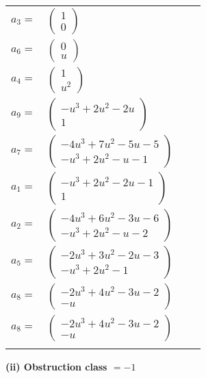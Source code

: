 \documentclass[1p]{elsarticle_modified}
\theoremstyle{definition}
\begin{document}
\begin{tabular}{m{7pt} m{180pt} m{7pt} m{180pt} }
\flushright $a_{3}=$&$\begin{pmatrix}1\\0\end{pmatrix}$ \\
\flushright $a_{6}=$&$\begin{pmatrix}0\\u\end{pmatrix}$ \\
\flushright $a_{4}=$&$\begin{pmatrix}1\\u^2\end{pmatrix}$ \\
\flushright $a_{9}=$&$\begin{pmatrix}- u^3+2 u^2-2 u\\1\end{pmatrix}$ \\
\flushright $a_{7}=$&$\begin{pmatrix}-4 u^3+7 u^2-5 u-5\\- u^3+2 u^2- u-1\end{pmatrix}$ \\
\flushright $a_{1}=$&$\begin{pmatrix}- u^3+2 u^2-2 u-1\\1\end{pmatrix}$ \\
\flushright $a_{2}=$&$\begin{pmatrix}-4 u^3+6 u^2-3 u-6\\- u^3+2 u^2- u-2\end{pmatrix}$ \\
\flushright $a_{5}=$&$\begin{pmatrix}-2 u^3+3 u^2-2 u-3\\- u^3+2 u^2-1\end{pmatrix}$ \\
\flushright $a_{8}=$&$\begin{pmatrix}-2 u^3+4 u^2-3 u-2\\- u\end{pmatrix}$\\ \flushright $a_{8}=$&$\begin{pmatrix}-2 u^3+4 u^2-3 u-2\\- u\end{pmatrix}$\\&\end{tabular}
\flushleft \textbf{(ii) Obstruction class $= -1$}\\~\\
\end{document}
